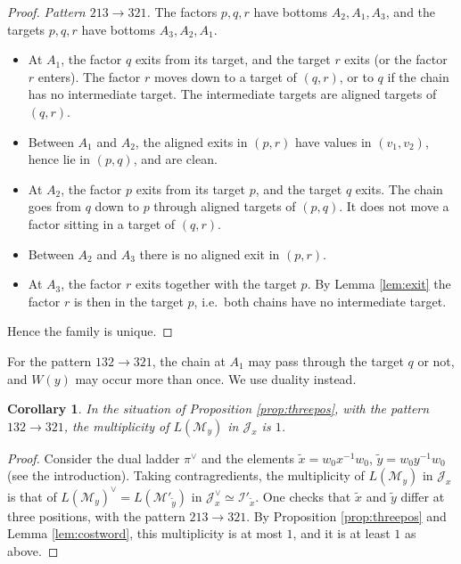 \documentclass[a4paper,12pt,leqno]{amsart}
\newcommand{\caI}{\mathcal{I}}
\newcommand{\caJ}{\mathcal{J}}
\newcommand{\caM}{\mathcal{M}}
\theoremstyle{plain}
\newtheorem{cor}[thm]{Corollary}
\theoremstyle{definition}
\theoremstyle{definition}
\begin{document}
\begin{proof}
\emph{Pattern $213\rightarrow321$.} The factors $p,q,r$ have bottoms $A_2,A_1,A_3$, and the targets
$p,q,r$ have bottoms $A_3,A_2,A_1$.
\begin{itemize}
\item At $A_1$, the factor $q$ exits from its target, and the target $r$ exits (or the factor $r$
enters). The factor $r$ moves down to a target of $(q,r)$, or to $q$ if the chain has no
intermediate target. The intermediate targets are aligned targets of $(q,r)$.
\item Between $A_1$ and $A_2$, the aligned exits in $(p,r)$ have values in $(v_1,v_2)$, hence lie
in $(p,q)$, and are clean.
\item At $A_2$, the factor $p$ exits from its target $p$, and the target $q$ exits. The chain goes
from $q$ down to $p$ through aligned targets of $(p,q)$. It does not move a factor sitting in a
target of $(q,r)$.
\item Between $A_2$ and $A_3$ there is no aligned exit in $(p,r)$.
\item At $A_3$, the factor $r$ exits together with the target $p$. By Lemma \ref{lem:exit} the factor
$r$ is then in the target $p$, i.e.\ both chains have no intermediate target.
\end{itemize}
Hence the family is unique.

\end{proof}

For the pattern $132\rightarrow321$, the chain at $A_1$ may pass through the target $q$ or not, and
$W(y)$ may occur more than once. We use duality instead.

\begin{cor}\label{cor:132} In the situation of Proposition \ref{prop:threepos}, with the pattern
$132\rightarrow321$, the multiplicity of $L(\caM_y)$ in $\caJ_x$ is $1$.
\end{cor}

\begin{proof} Consider the dual ladder $\pi^\vee$ and the elements $\tilde x=w_0x^{-1}w_0$, $\tilde
y=w_0y^{-1}w_0$ (see the introduction). Taking contragredients, the multiplicity of $L(\caM_y)$ in
$\caJ_x$ is that of $L(\caM_y)^\vee=L(\caM'_{\tilde y})$ in $\caJ_x^\vee\simeq\caI'_{\tilde x}$. One
checks that $\tilde x$ and $\tilde y$ differ at three positions, with the pattern $213\rightarrow321$.
By Proposition \ref{prop:threepos} and Lemma \ref{lem:costword}, this multiplicity is at most $1$, and
it is at least $1$ as above.
\end{proof}
\end{document}
